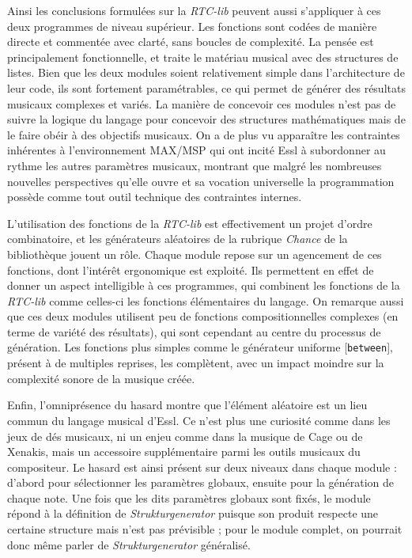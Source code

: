 \documentclass[a4paper,12pt]{article}
\newcommand{\patch}[1]{[\texttt{#1}]}
\begin{document}
Ainsi les conclusions formulées sur la \emph{RTC-lib} peuvent aussi s'appliquer à ces deux programmes de niveau supérieur. Les fonctions sont codées de manière directe et commentée avec clarté, sans boucles de complexité. La pensée est principalement fonctionnelle, et traite le matériau musical avec des structures de listes. Bien que les deux modules soient relativement simple dans l'architecture de leur code, ils sont fortement paramétrables, ce qui permet de générer des résultats musicaux complexes et variés. La manière de concevoir ces modules n'est pas de suivre la logique du langage pour concevoir des structures mathématiques mais de le faire obéir à des objectifs musicaux. On a de plus vu apparaître les contraintes inhérentes à l'environnement MAX/MSP qui ont incité Essl à subordonner au rythme les autres paramètres musicaux, montrant que malgré les nombreuses nouvelles perspectives qu'elle ouvre et sa vocation universelle la programmation possède comme tout outil technique des contraintes internes.

L'utilisation des fonctions de la \emph{RTC-lib} est effectivement un projet d'ordre combinatoire, et les générateurs aléatoires de la rubrique \emph{Chance} de la bibliothèque jouent un rôle. Chaque module repose sur un agencement de ces fonctions, dont l'intérêt ergonomique est exploité. Ils permettent en effet de donner un aspect intelligible à ces programmes, qui combinent les fonctions de la \emph{RTC-lib} comme celles-ci les fonctions élémentaires du langage. On remarque aussi que ces deux modules utilisent peu de fonctions compositionnelles complexes (en terme de variété des résultats), qui sont cependant au centre du processus de génération. Les fonctions plus simples comme le générateur uniforme \patch{between}, présent à de multiples reprises, les complètent, avec un impact moindre sur la complexité sonore de la musique créée.

Enfin, l'omniprésence du hasard montre que l'élément aléatoire est un lieu commun du langage musical d'Essl. Ce n'est plus une curiosité comme dans les jeux de dés musicaux, ni un enjeu comme dans la musique de Cage ou de Xenakis, mais un accessoire supplémentaire parmi les outils musicaux du compositeur. Le hasard est ainsi présent sur deux niveaux dans chaque module : d'abord pour sélectionner les paramètres globaux, ensuite pour la génération de chaque note. Une fois que les dits paramètres globaux sont fixés, le module répond à la définition de \emph{Strukturgenerator} puisque son produit respecte une certaine structure mais n'est pas prévisible ; pour le module complet, on pourrait donc même parler de \emph{Strukturgenerator} généralisé.
\end{document}
